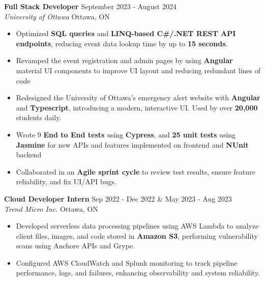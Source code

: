 \documentclass[a4paper]{article}
\begin{document}
\textbf{Full Stack Developer} \hfill September 2023 - August 2024\\
\textit{University of Ottawa} \hfill Ottawa, ON\\
\vspace{-2mm}
\begin{itemize} \itemsep -2pt
    \item Optimized \textbf{SQL queries} and \textbf{LINQ-based C\#/.NET REST API endpoints}, reducing event data lookup time by up to \textbf{15 seconds}.
    \item Revamped the event registration and admin pages by using \textbf{Angular} material UI components to improve UI layout and reducing redundant lines of code
    \item Redesigned the University of Ottawa's emergency alert website with \textbf{Angular} and \textbf{Typescript}, introducing a modern, interactive UI. Used by over \textbf{20,000} students daily.
    \item Wrote 9 \textbf{End to End tests} using \textbf{Cypress}, and \textbf{25 unit tests} using \textbf{Jasmine} for new APIs and features implemented on frontend and \textbf{NUnit} backend
    \item Collaborated in an \textbf{Agile sprint cycle} to review test results, ensure feature reliability, and fix UI/API bugs.
\end{itemize}

\textbf{Cloud Developer Intern} \hfill Sep 2022 - Dec 2022 \& May 2023 - Aug 2023\\
\textit{Trend Micro Inc.} \hfill Ottawa, ON\\
\vspace{-2mm}
\begin{itemize} \itemsep -2pt
    \item Developed serverless data processing pipelines using AWS Lambda to analyze client files, images, and code stored in \textbf{Amazon S3}, performing vulnerability scans using Anchore APIs and Grype.


    \item Configured AWS CloudWatch and Splunk monitoring to track pipeline performance, logs, and failures, enhancing observability and system reliability.
\end{itemize}
\end{document}
